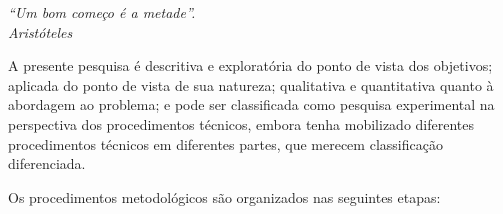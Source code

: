 \label{metodologia}

	\begin{flushright}
		\textit{``Um bom começo é a metade''.\\
		Aristóteles}
	\end{flushright}



A presente pesquisa é descritiva e exploratória do ponto de vista dos objetivos; aplicada do ponto de vista de sua natureza; qualitativa e quantitativa quanto à abordagem ao problema; e pode ser classificada como pesquisa experimental na perspectiva dos procedimentos técnicos, embora tenha mobilizado diferentes procedimentos técnicos em diferentes partes, que merecem classificação diferenciada.

Os procedimentos metodológicos são organizados nas seguintes etapas: 

